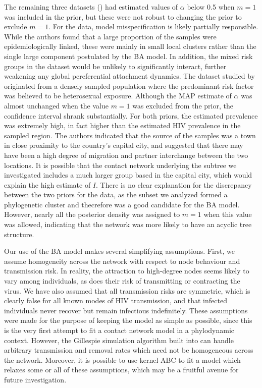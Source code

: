 The remaining three datasets (\textcite{cuevas2009hiv, novitsky2014impact,
li2015hiv}) had estimated values of $\alpha$ below 0.5 when $m = 1$ was
included in the prior, but these were not robust to changing the prior to
exclude $m = 1$. For the \citeauthor{cuevas2009hiv} data, model
misspecification is likely partially responsible. While the authors found that
a large proportion of the samples were epidemiologically linked, these were
mainly in small local clusters rather than the single large component
postulated by the BA model. In addition, the mixed risk groups in the dataset
would be unlikely to significantly interact, further weakening any global
pcreferential attachment dynamics. The dataset studied by
\textcite{novitsky2014impact} originated from a densely sampled population
where the predominant risk factor was believed to be heterosexual exposure.
Although the MAP estimate of $\alpha$ was almost unchanged when the value $m =
1$ was excluded from the prior, the confidence interval shrank substantially.
For both priors, the estimated prevalence was extremely high, in fact higher
than the estimated HIV prevalence in the sampled region. The authors indicated
that the source of the samples was a town in close proximity to the country's
capital city, and suggested that there may have been a high degree of migration
and partner interchange between the two locations. It is possible that the
contact network underlying the subtree we investigated includes a much larger
group based in the capital city, which would explain the high estimate of $I$.
There is no clear explanation for the discrepancy between the two priors for
the \textcite{li2015hiv} data, as the subset we analyzed formed a phylogenetic
cluster and thecrefore was a good candidate for the BA model. However, nearly
all the posterior density was assigned to $m = 1$ when this value was allowed,
indicating that the network was more likely to have an acyclic tree structure.

Our use of the \gls{BA} model makes several simplifying assumptions. First, we
assume homogeneity across the network with respect to node behaviour and
transmission risk. In reality, the attraction to high-degree nodes seems likely
to vary among individuals, as does their risk of transmitting or contracting
the virus. We have also assumed that all transmission risks are symmetric,
which is clearly false for all known modes of \gls{HIV} transmission, and that
infected individuals never recover but remain infectious indefinitely. These
assumptions were made for the purpose of keeping the model as simple as
possible, since this is the very first attempt to fit a contact network model
in a phylodynamic context. However, the Gillespie simulation algorithm built
into  can handle arbitrary transmission and removal rates
which need not be homogeneous across the network. Moreover, it is possible to
use kernel-\gls{ABC} to fit a model which relaxes some or all of these
assumptions, which may be a fruitful avenue for future investigation.
